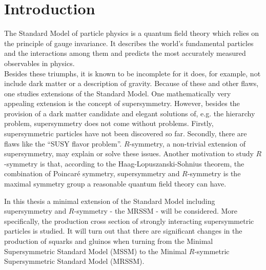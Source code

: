 \section{Introduction}
The Standard Model of particle physics is a quantum field theory which relies on the principle of gauge invariance. It describes the world's fundamental particles and the interactions among them and predicts the most accurately measured observables in physics.\\
Besides these triumphs, it is known to be incomplete for it does, for example, not include dark matter or a description of gravity. Because of these and other flaws, one studies extensions of the Standard Model. One mathematically very appealing extension is the concept of supersymmetry. However, besides the provision of a dark matter candidate and elegant solutions of, e.g. the hierarchy problem, supersymmetry does not come without problems. Firstly, supersymmetric particles have not been discovered so far. Secondly, there are flaws like the ``SUSY flavor problem''. $R$-symmetry, a non-trivial extension of supersymmetry, may explain or solve these issues.
Another motivation to study $R$-symmetry is that, according to the Haag-Lopuszanski-Sohnius theorem, the combination of Poincaré symmetry, supersymmetry and $R$-symmetry is the maximal symmetry group a reasonable quantum field theory can have.\\
In this thesis a minimal extension of the Standard Model including supersymmetry and \mbox{$R$-symmetry} - the MRSSM - will be considered. More specifically, the production cross section of strongly interacting supersymmetric particles is studied. It will turn out that there are significant changes in the production of squarks and gluinos when turning from the Minimal Supersymmetric Standard Model (MSSM) to the Minimal $R$-symmetric Supersymmetric Standard Model (MRSSM).\\
